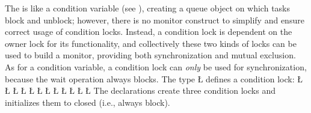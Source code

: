 \documentclass[openright,twoside]{report}
\begin{document}
The  is like a condition variable (see ), creating a queue object on which tasks block and unblock;
however, there is no monitor construct to simplify and ensure correct usage of condition locks.
Instead, a condition lock is dependent on the owner lock for its functionality, and collectively these two kinds of locks can be used to build a monitor, providing both synchronization and mutual exclusion.
As for a condition variable, a condition lock can \emph{only} be used for synchronization, because the wait operation always blocks.
The type \LGinlinetrue\LGbegin\lgrinde\L{}\endlgrinde\LGend{} defines a condition lock:
\LGinlinefalse\LGbegin\lgrinde
\L{}
\L{}
\L{\LB{}}
\L{\LB{}}
\L{\LB{}}
\L{\LB{}}
\L{\LB{}}
\L{\LB{}}
\L{\LB{}}
\L{\LB{\};}}
\L{}
\L{}
\endlgrinde\LGend
{}%
%
%
%
The declarations create three condition locks and initializes them to closed (i.e., always block).
\end{document}
